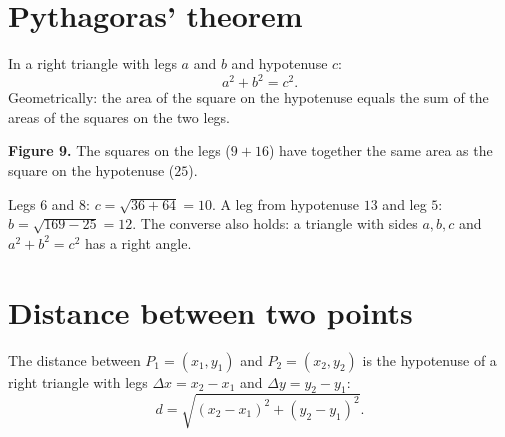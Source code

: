 \label{ch:pythagoras}

\section*{Pythagoras' theorem}
In a right triangle with legs $a$ and $b$ and hypotenuse $c$:
\[
a^2+b^2=c^2.
\]
Geometrically: the area of the square on the hypotenuse equals the sum of the areas of the squares on the two legs.

\begin{center}

\small\textbf{Figure 9.} The squares on the legs ($9+16$) have together the same area as the square on the hypotenuse ($25$).
\end{center}

\begin{example}
Legs $6$ and $8$: $c=\sqrt{36+64}=10$. A leg from hypotenuse $13$ and leg $5$: $b=\sqrt{169-25}=12$. The converse also holds: a triangle with sides $a,b,c$ and $a^2+b^2=c^2$ has a right angle.
\end{example}

\section*{Distance between two points}
The distance between $P_1=(x_1,y_1)$ and $P_2=(x_2,y_2)$ is the hypotenuse of a right triangle with legs $\Delta x=x_2-x_1$ and $\Delta y=y_2-y_1$:
\[
d=\sqrt{(x_2-x_1)^2+(y_2-y_1)^2}.
\]

